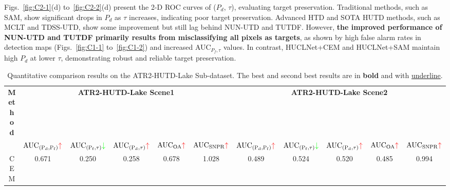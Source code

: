 Figs.~\ref{fig:C2-1}(d) to~\ref{fig:C2-2}(d) present the 2-D ROC curves of ($P_d$, $\tau$), evaluating target preservation. Traditional methods, such as SAM, show significant drops in $P_d$ as $\tau$ increases, indicating poor target preservation. Advanced HTD and SOTA HUTD methods, such as MCLT and TDSS-UTD, show some improvement but still lag behind NUN-UTD and TUTDF. However, \textbf{the improved performance of NUN-UTD and TUTDF primarily results from misclassifying all pixels as targets}, as shown by high false alarm rates in detection maps (Figs.~\ref{fig:C1-1} to~\ref{fig:C1-2}) and increased AUC$_{P_{f}, \tau}$ values. In contrast, HUCLNet+CEM and HUCLNet+SAM maintain high $P_d$ at lower $\tau$, demonstrating robust and reliable target preservation.
\par
\begin{table*}[!t] 
    \centering
    \footnotesize   
    \caption{Quantitative comparison results on the ATR2-HUTD-Lake Sub-dataset. The best and second best results are in \textbf{bold} and with \underline{underline}.} \label{auc_lake}
    \renewcommand{\arraystretch}{1.5}
    \setlength{\tabcolsep}{1.85mm}
    \scalebox{0.875}
    {
        \begin{tabular}{ccccccccccc}
            \hline
            \multirow{2.4}{*}{\textbf{Method}} & \multicolumn{5}{c}{\cellcolor{tablecolor7!60}\textbf{ATR2-HUTD-Lake Scene1}}       & \multicolumn{5}{c}{\cellcolor{tablecolor8}\textbf{ATR2-HUTD-Lake Scene2}}       \\ \cmidrule(lr){2-6} \cmidrule(lr){7-11}
                                    & $\text{AUC}_{( \mathrm{P}_{\mathrm{d}},\mathrm{P}_{\mathrm{f}})}\textcolor{red}{\uparrow }$ & $\text{AUC}_{( \mathrm{P}_{\mathrm{f}}, \tau)}\textcolor{green}{\downarrow }$ & $\text{AUC}_{( \mathrm{P}_{\mathrm{d}},\tau)}\textcolor{red}{\uparrow }$ & $\mathrm{AUC}_{\mathrm{OA}} \textcolor{red}{\uparrow }$ & $\mathrm{AUC}_{\mathrm{SNPR}}\textcolor{red}{\uparrow }$ & $\text{AUC}_{( \mathrm{P}_{\mathrm{d}},\mathrm{P}_{\mathrm{f}})}\textcolor{red}{\uparrow }$ & $\text{AUC}_{( \mathrm{P}_{\mathrm{f}}, \tau)}\textcolor{green}{\downarrow }$ & $\text{AUC}_{( \mathrm{P}_{\mathrm{d}},\tau)}\textcolor{red}{\uparrow }$ & $\mathrm{AUC}_{\mathrm{OA}} \textcolor{red}{\uparrow }$ & $\mathrm{AUC}_{\mathrm{SNPR}}\textcolor{red}{\uparrow }$ \\ \hline
                                    CEM         & 0.671          & 0.250          & 0.258          & 0.678          & 1.028          & 0.489          & 0.524          & 0.520          & 0.485          & 0.994          \\

\end{tabular}}
\end{table*}
